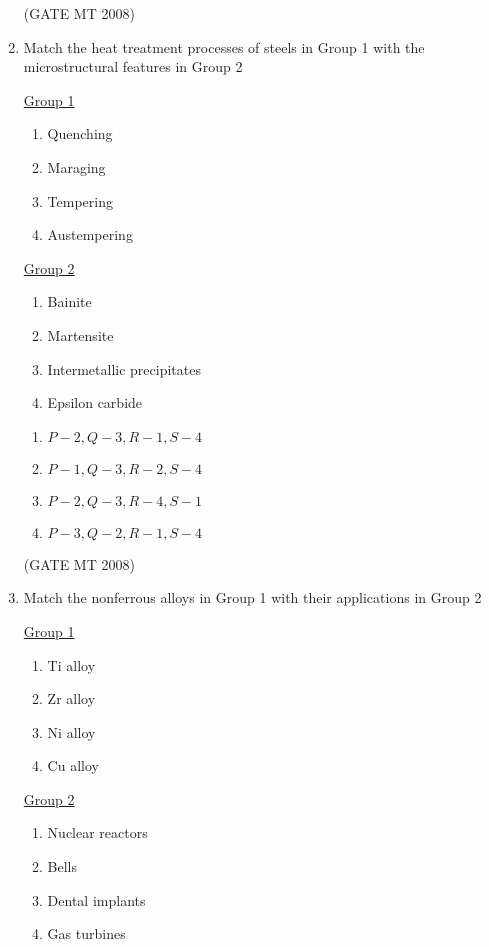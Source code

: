 \documentclass[11pt, letterpaper]{article}
\theoremstyle{remark}
\begin{document}
\begin{enumerate}
\hfill(GATE MT 2008) 

\item Match the heat treatment processes of steels in Group 1 with the microstructural features in Group 2
\begin{multicols}{2}
\underline{Group 1}
\begin{enumerate}[label=(\Alph*), start=16]
\item Quenching
\item Maraging 
\item Tempering
\item Austempering
\end{enumerate}

\underline{Group 2}
\begin{enumerate}[label=(\arabic*), start=1]
\item Bainite
\item Martensite
\item Intermetallic precipitates
\item Epsilon carbide
\end{enumerate}
\end{multicols}

\begin{multicols}{2}
\begin{enumerate} 
\item $P-2, Q-3, R-1, S-4$
\item $P-1, Q-3, R-2, S-4$
\item $P-2, Q-3, R-4, S-1$
\item $P-3, Q-2, R-1, S-4$
\end{enumerate}
\end{multicols}

\hfill(GATE MT 2008) 

\item Match the nonferrous alloys in Group 1 with their applications in Group 2
\begin{multicols}{2}
\underline{Group 1}
\begin{enumerate}[label=(\Alph*), start=16]
\item Ti alloy
\item Zr alloy
\item Ni alloy
\item Cu alloy
\end{enumerate}

\underline{Group 2}
\begin{enumerate}[label=(\arabic*), start=1]
\item Nuclear reactors
\item Bells
\item Dental implants 
\item Gas turbines
\end{enumerate}
\end{multicols}


\end{enumerate}
\end{document}
